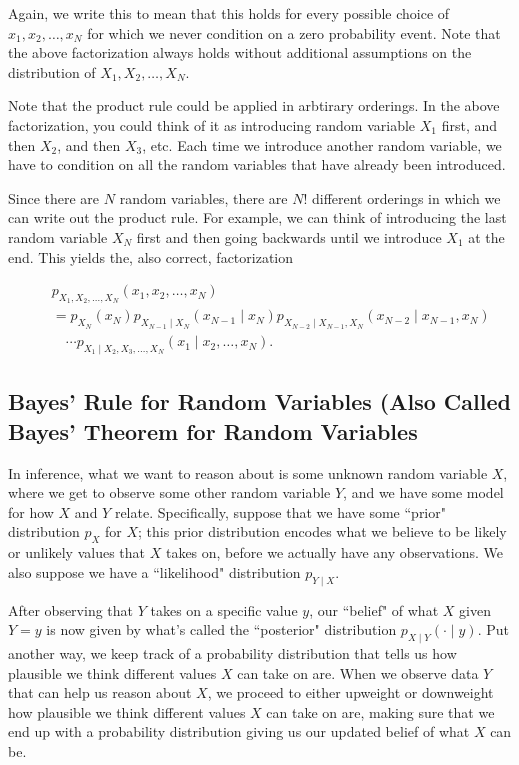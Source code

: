 \documentclass[6008notes.tex]{subfiles}
\begin{document}
Again, we write this to mean that this holds for every possible choice of $x_1, x_2, \dots , x_ N$ for which we never condition on a zero probability event. Note that the above factorization always holds without additional assumptions on the distribution of $X_1, X_2, \dots , X_ N$.

Note that the product rule could be applied in arbtirary orderings. In the above factorization, you could think of it as introducing random variable $X_1$ first, and then $X_2$, and then $X_3$, etc. Each time we introduce another random variable, we have to condition on all the random variables that have already been introduced.

Since there are $N$ random variables, there are $N!$ different orderings in which we can write out the product rule. For example, we can think of introducing the last random variable $X_ N$ first and then going backwards until we introduce $X_1$ at the end. This yields the, also correct, factorization

\begin{eqnarray*}
&& p_{X_1, X_2, \dots ,X_N}(x_1, x_2, \dots, x_N) \\
&&=
  p_{X_N}(x_N)
  p_{X_{N-1} \mid X_N}(x_{N-1} \mid x_N)
  p_{X_{N-2} \mid X_{N-1}, X_N}(x_{N-2} \mid x_{N-1}, x_N) \\
&&\quad
  \cdots
  p_{X_1 \mid X_2, X_3, \dots, X_N}(x_1 \mid x_2, \dots, x_N).
\end{eqnarray*}

\subsection{Bayes' Rule for Random Variables (Also Called Bayes' Theorem for Random Variables}

In inference, what we want to reason about is some unknown random variable $X$, where we get to observe some other random variable $Y$, and we have some model for how $X$ and $Y$ relate. Specifically, suppose that we have some “prior" distribution $p_X$ for $X$; this prior distribution encodes what we believe to be likely or unlikely values that $X$ takes on, before we actually have any observations. We also suppose we have a “likelihood" distribution $p_{Y\mid X}$.

After observing that $Y$ takes on a specific value $y$, our “belief" of what $X$ given $Y=y$ is now given by what's called the “posterior" distribution $p_{X\mid Y}(\cdot \mid y)$. Put another way, we keep track of a probability distribution that tells us how plausible we think different values $X$ can take on are. When we observe data $Y$ that can help us reason about $X$, we proceed to either upweight or downweight how plausible we think different values $X$ can take on are, making sure that we end up with a probability distribution giving us our updated belief of what $X$ can be.
\end{document}
